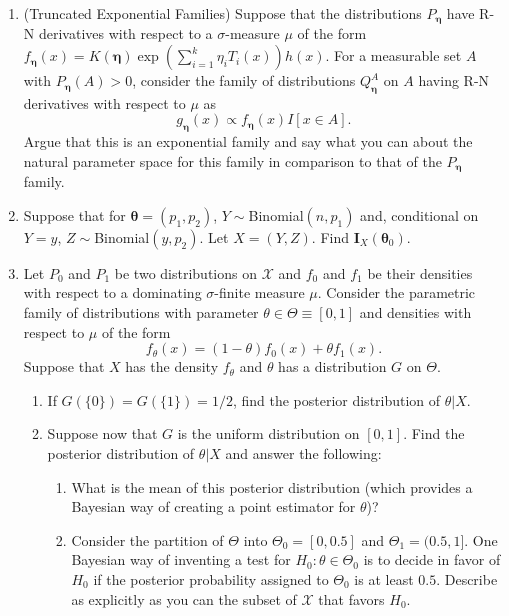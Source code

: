 \documentclass[11pt]{article}
\begin{document}
\begin{enumerate}
\item (Truncated Exponential Families) Suppose that the distributions $P_{\bm{\eta}}$ have R-N derivatives with respect to a
$\sigma$-measure $\mu$ of the form $f_{\bm{\eta}}(x) = K(\bm{\eta}) \exp \left(  \sum_{i=1}^k \eta_i T_i(x)\right) h(x)$.
For a measurable set $A$ with $P_{\bm{\eta}}(A)>0$, consider the family of distributions $Q_{\bm{\eta}}^A$ on $A$ having R-N derivatives
with respect to $\mu$ as
\[
g_{\bm{\eta}}(x ) \propto f_{\bm{\eta}}(x) I[x\in A].
\]
Argue that this is an exponential family and say what you can about the natural parameter space for this family in comparison to that of the $P_{\bm{\eta}}$ family.


\item Suppose that for $\bm{\theta}=(p_1,p_2)$, $Y\sim$Binomial$(n,p_1)$ and, conditional on $Y=y$, $Z\sim$Binomial$(y,p_2)$. Let $X=(Y,Z)$.  Find $\bm{I}_{X}(\bm{\theta}_0)$.

\item Let $P_0$ and $P_1$ be two distributions on $\mathcal{X}$ and $f_0$ and $f_1$ be their densities with respect to a dominating $\sigma$-finite
measure $\mu$.  Consider the parametric family of distributions with parameter $\theta \in \Theta \equiv [0,1]$ and densities with respect to $\mu$
of the form
\[
f_\theta(x) = (1-\theta) f_0(x) +\theta f_1(x).
\]
Suppose that $X$ has the density $f_\theta$ and $\theta$ has a distribution $G$ on $\Theta$.
\begin{enumerate}
\item If $G(\{0\})=G(\{1\})=1/2$, find the posterior distribution of $\theta|X$.
\item Suppose now that $G$ is the uniform distribution on $[0,1]$.  Find the posterior distribution of $\theta|X$ and answer  the following:

\begin{enumerate}
\item What is the mean of this posterior distribution (which provides a Bayesian way of creating a point estimator for $\theta$)?
\item Consider the partition of $\Theta$ into $\Theta_0=[0,0.5]$ and $\Theta_1=(0.5,1]$.  One Bayesian way of inventing a test for $H_0: \theta \in \Theta_0$ is to decide in favor of $H_0$ if the posterior probability assigned to $\Theta_0$ is at least $0.5$. Describe as explicitly as you can the subset of $\mathcal{X}$ that favors $H_0$.
\end{enumerate}
\end{enumerate}


\end{enumerate}
\end{document}
